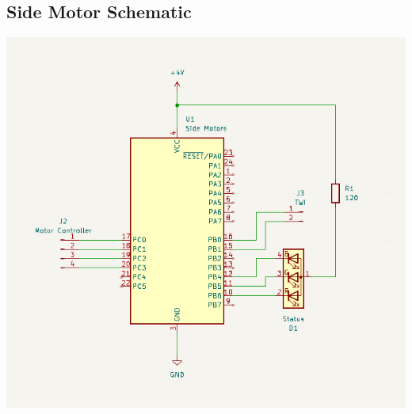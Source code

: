 \documentclass[11pt,a4paper,titlepage]{report}
\begin{document}
	\subsection{Side Motor Schematic}\label{appendix:side_motor_schematic}
	\begin{center}
		\label{picture:side_motor_schematic}
		\includegraphics[width=\linewidth]{assets/SideMotorSchematic.png}
	\end{center}
	
	
	
	
	\printbibliography
\end{document}
